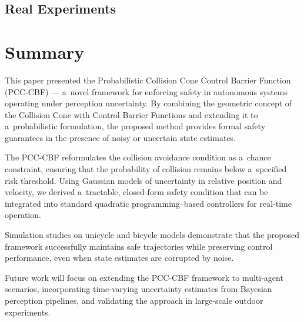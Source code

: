 \documentclass{svproc}
\begin{document}
    \subsection{Real Experiments}

\section{Summary}\label{sec:summary}
This paper presented the Probabilistic Collision Cone Control Barrier Function
(PCC-CBF) — a~novel framework for enforcing safety in autonomous systems
operating under perception uncertainty. By combining the geometric concept of
the Collision Cone with Control Barrier Functions and extending it to
a~probabilistic formulation, the proposed method provides formal safety
guarantees in the presence of noisy or uncertain state estimates.

The PCC-CBF reformulates the collision avoidance condition as a~chance
constraint, ensuring that the probability of collision remains below a~specified
risk threshold. Using Gaussian models of uncertainty in relative position and
velocity, we derived a~tractable, closed-form safety condition that can be
integrated into standard quadratic programming–based controllers for real-time
operation.

Simulation studies on unicycle and bicycle models demonstrate that the proposed
framework successfully maintains safe trajectories while preserving control
performance, even when state estimates are corrupted by noise.

Future work will focus on extending the PCC-CBF framework to multi-agent
scenarios, incorporating time-varying uncertainty estimates from Bayesian
perception pipelines, and validating the approach in large-scale outdoor experiments.



\end{document}

